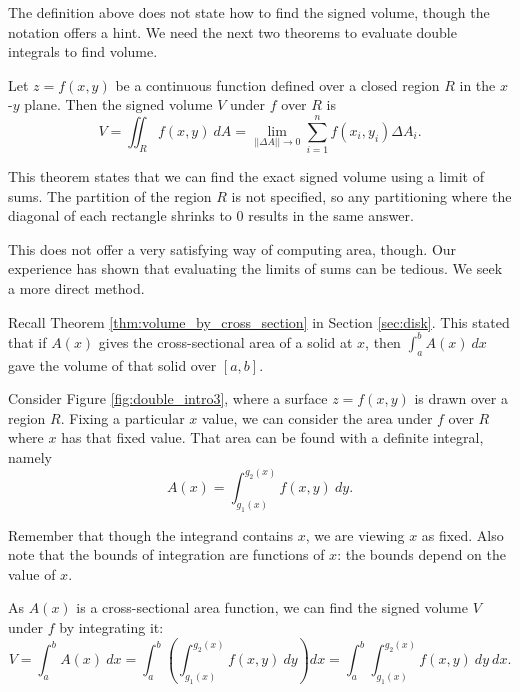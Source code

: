 The definition above does not state how to find the signed volume, though the notation offers a hint. We need the next two theorems to evaluate double integrals to find volume.

{Let $z=f(x,y)$ be a continuous function defined over a closed region $R$ in the $x$-$y$ plane. Then the signed volume $V$ under $f$ over $R$ is
$$V = \iint_R f(x,y)\ dA = \lim_{||\Delta A||\to 0}\sum_{i=1}^n f(x_i,y_i)\Delta A_i.$$
}

This theorem states that we can find the exact signed volume using a limit of sums. The partition of the region $R$ is not specified, so any partitioning where the diagonal of each rectangle shrinks to 0 results in the same answer. 

This does not offer a very satisfying way of computing area, though. Our experience has shown that evaluating the limits of sums can be tedious. We seek a more direct method.

Recall Theorem \ref{thm:volume_by_cross_section} in Section \ref{sec:disk}. This stated that if $A(x)$ gives the cross-sectional area of a solid at $x$, then $\int_a^b A(x)\ dx$ gave the volume of that solid over $[a,b]$. 

Consider Figure \ref{fig:double_intro3}, where a surface $z=f(x,y)$ is drawn over a region $R$. Fixing a particular $x$ value, we can consider the area under $f$ over $R$ where $x$ has that fixed value. That area can be found with a definite integral, namely $$ A(x)=\int_{g_1(x)}^{g_2(x)} f(x,y)\ dy.$$

Remember that though the integrand contains $x$, we are viewing $x$ as fixed. Also note that the bounds of integration are functions of $x$: the bounds depend on the value of $x$. 


As $A(x)$ is a cross-sectional area function, we can find the signed volume $V$ under $f$ by integrating it:
$$V = \int_a^b A(x)\ dx = \int_a^b\left(\int_{g_1(x)}^{g_2(x)} f(x,y)\ dy\right)dx = \int_a^b\int_{g_1(x)}^{g_2(x)} f(x,y)\ dy\ dx.$$


